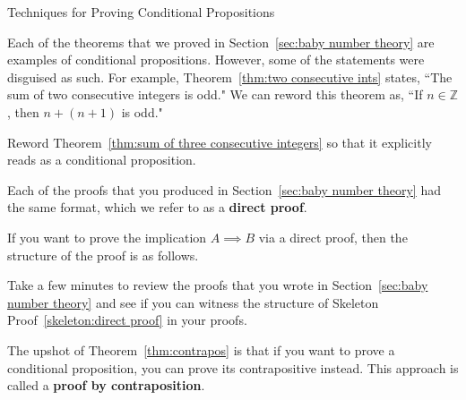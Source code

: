 \begin{section}{Techniques for Proving Conditional Propositions}

Each of the theorems that we proved in Section~\ref{sec:baby number theory} are examples of conditional propositions. However, some of the statements were disguised as such. For example, Theorem~\ref{thm:two consecutive ints} states, ``The sum of two consecutive integers is odd." We can reword this theorem as, ``If $n\in\mathbb{Z}$, then $n+(n+1)$ is odd."

\begin{problem}\label{prob:reword as conditional}
Reword Theorem~\ref{thm:sum of three consecutive integers} so that it explicitly reads as a conditional proposition.
\end{problem}

Each of the proofs that you produced in Section~\ref{sec:baby number theory} had the same format, which we refer to as a \textbf{direct proof}. 

\begin{skeleton}\label{skeleton:direct proof}

If you want to prove the implication $A\implies B$ via a direct proof, then the structure of the proof is as follows.

\begin{center}
\end{center}
\end{skeleton}

Take a few minutes to review the proofs that you wrote in Section~\ref{sec:baby number theory} and see if you can witness the structure of Skeleton Proof~\ref{skeleton:direct proof} in your proofs. 

The upshot of Theorem~\ref{thm:contrapos} is that if you want to prove a conditional proposition, you can prove its contrapositive instead. This approach is called a \textbf{proof by contraposition}.


\end{section}
